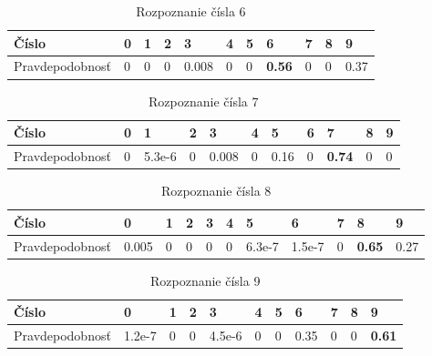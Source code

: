 \begin{table}[H]
  \begin{tabular}{ | l | l | l | l | l | l | l | l | l | l | l |}
    \hline
    Číslo & 0 & 1 & 2 & 3 & 4 & 5 & 6 & 7 & 8 & 9 \\ \hline
    Pravdepodobnosť & 0 & 0 & 0 & 0.008 & 0 & 0 & \textbf{0.56} & 0 & 0 & 0.37 \\
    \hline
  \end{tabular}
  \caption[Rozpoznanie čísla 6]{Rozpoznanie čísla 6}
\end{table}

\begin{table}[H]
  \begin{tabular}{ | l | l | l | l | l | l | l | l | l | l | l |}
    \hline
    Číslo & 0 & 1 & 2 & 3 & 4 & 5 & 6 & 7 & 8 & 9 \\ \hline
    Pravdepodobnosť & 0 & 5.3e-6 & 0 & 0.008 & 0 & 0.16 & 0 & \textbf{0.74} & 0 & 0 \\
    \hline
  \end{tabular}
  \caption[Rozpoznanie čísla 7]{Rozpoznanie čísla 7}
\end{table}

\begin{table}[H]
  \begin{tabular}{ | l | l | l | l | l | l | l | l | l | l | l |}
    \hline
    Číslo & 0 & 1 & 2 & 3 & 4 & 5 & 6 & 7 & 8 & 9 \\ \hline
    Pravdepodobnosť & 0.005 & 0 & 0 & 0 & 0 & 6.3e-7 & 1.5e-7 & 0 & \textbf{0.65} & 0.27 \\
    \hline
  \end{tabular}
  \caption[Rozpoznanie čísla 8]{Rozpoznanie čísla 8}
\end{table}

\begin{table}[H]
  \begin{tabular}{ | l | l | l | l | l | l | l | l | l | l | l |}
    \hline
    Číslo & 0 & 1 & 2 & 3 & 4 & 5 & 6 & 7 & 8 & 9 \\ \hline
    Pravdepodobnosť & 1.2e-7 & 0 & 0 & 4.5e-6 & 0 & 0 & 0.35 & 0 & 0 & \textbf{0.61} \\
    \hline
  \end{tabular}
  \caption[Rozpoznanie čísla 9]{Rozpoznanie čísla 9}
\end{table}




\newpage
